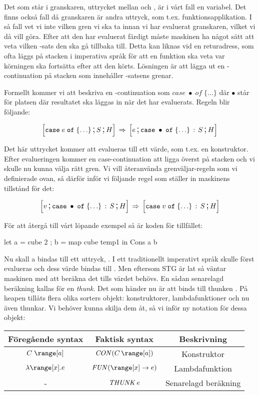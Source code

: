 \documentclass[../Core]{subfiles}
\begin{document}
Det som står i granskaren, uttrycket mellan  och , är i vårt
fall en variabel. Det finns också fall då granskaren är andra uttryck, som
t.ex. funktionsapplikation. I så fall vet vi inte vilken gren vi ska
ta innan vi har evaluerat granskaren, vilket vi då vill göra.
Efter att den har evaluerat färdigt måste maskinen ha något sätt att
veta vilken -sats den ska gå tillbaka till. Detta kan liknas
vid en returadress, som ofta läggs på stacken i imperativa språk för att
en funktion ska veta var körningen ska fortsätta efter att den körts.
Lösningen är att lägga ut en -continuation på stacken
som innehåller -satsens grenar.

Formellt kommer vi att beskriva en -continuation som $case\;\bullet\; of\;\{\ldots\}$
där $\bullet$ står för platsen där resultatet ska läggas in när det har evaluerats. Regeln
blir följande:

\[
\text{\large$$}\Big[\mathtt{case}\; e\; \mathtt{of}\;\{\ldots\} \,\text{\Large;}\, S \,\text{\Large;}\, H\Big] \,\Rightarrow\, \text{\large$$}\Big[e \,\text{\Large;}\, \mathtt{case}\;\bullet\; \mathtt{of}\;\{\ldots\} \,:\, S \,\text{\Large;}\,  H\Big]
\]


Det här uttrycket kommer att evalueras till ett värde, som t.ex. en konstruktor.
Efter evalueringen kommer en case-continuation att ligga överst på stacken och vi skulle nu kunna välja
rätt gren. Vi vill återanvända grenväljar-regeln som vi definierade
ovan, så därför inför vi följande regel som ställer in maskinens tillstånd för det:

\[
\text{\large$$}\Big[v \,\text{\Large;}\, \mathtt{case}\;\bullet\; \mathtt{of}\;\{\ldots\} \,:\, S \,\text{\Large;}\, H\Big]\,\Rightarrow\, \text{\large$$}\Big[\mathtt{case}\; v\; \mathtt{of}\;\{\ldots\} \,:\, S \,\text{\Large;}\, H\Big]
\]


För att återgå till vårt löpande exempel så är koden för tillfället:

\begin{codeEx}
let { a = cube 2
    ; b = map cube temp1
    } in Cons a b
\end{codeEx}

Nu skall a bindas till ett uttryck, . I ett traditionellt imperativt språk skulle
 först evalueras och dess värde bindas till . Men eftersom STG
är lat så väntar maskinen med att beräkna det tills värdet behövs.
En sådan senarelagd beräkning kallas för en \emph{thunk}. Det som händer nu är att
 binds till thunken . På heapen tillåts flera olika
sorters objekt: konstruktorer, lambdafunktioner och nu även thunkar.
Vi behöver kunna skilja dem åt, så vi inför ny notation för dessa objekt: \\[0.3cm]
\begin{tabular}{ccc}
Föregående syntax & Faktisk syntax & Beskrivning\tabularnewline
\hline
$C\;\range[a]$ & $\CON C{\range[a]}$ & Konstruktor\tabularnewline
$\lambda\range[x].e$ & $\FUN{\range[x]}e$ & Lambdafunktion\tabularnewline
- & $\text{\emph{THUNK}}\,e$ & Senarelagd beräkning\tabularnewline
\end{tabular} \\[0.3cm]
\end{document}

